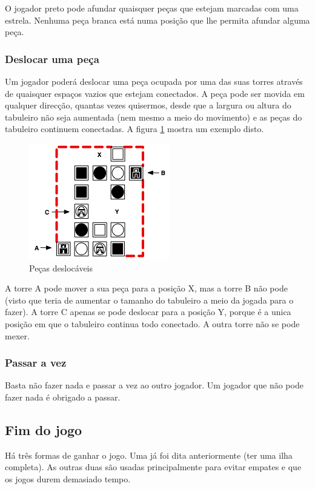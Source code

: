 \documentclass[a4paper]{article}
\begin{document}
O jogador preto pode afundar quaisquer peças que estejam marcadas com uma estrela. Nenhuma peça branca está numa posição que lhe permita afundar alguma peça.

\subsubsection{Deslocar uma peça}

Um jogador poderá deslocar uma peça ocupada por uma das suas torres através de quaisquer espaços vazios que estejam conectados. A peça pode ser movida em qualquer direcção, quantas vezes quisermos, desde que a largura ou altura do tabuleiro não seja aumentada (nem mesmo a meio do movimento) e as peças do tabuleiro continuem conectadas. A figura \ref{fig:slidetile} mostra um exemplo disto.

\begin{figure}[h]
\centering
\includegraphics[scale=0.9]{slidetile.png}
\caption{Peças deslocáveis}
\label{fig:slidetile}
\end{figure}

A torre A pode mover a sua peça para a posição X, mas a torre B não pode (visto que teria de aumentar o tamanho do tabuleiro a meio da jogada para o fazer). A torre C apenas se pode deslocar para a posição Y, porque é a unica posição em que o tabuleiro continua todo conectado. A outra torre não se pode mexer.

\subsubsection{Passar a vez}

Basta não fazer nada e passar a vez ao outro jogador. Um jogador que não pode fazer nada é obrigado a passar.


\subsection{Fim do jogo}

Há três formas de ganhar o jogo. Uma já foi dita anteriormente (ter uma ilha completa). As outras duas são usadas principalmente para evitar empates e que os jogos durem demasiado tempo.
\end{document}
